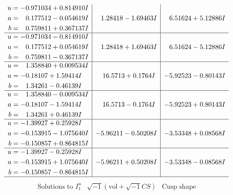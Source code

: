 \documentclass[1p]{elsarticle_modified}
\theoremstyle{definition}
\newcommand{\I}{\sqrt{-1}}
\begin{document}
$$\begin{array}{c|c|c}
\begin{aligned}
u &= -0.971034 + 0.814910 I \\
a &= \phantom{-}0.177512 - 0.054619 I \\
b &= \phantom{-}0.759811 + 0.367137 I\end{aligned}
 & \phantom{-}1.28418 - 1.69463 I & \phantom{-}6.51624 + 5.12886 I \\ \hline\begin{aligned}
u &= -0.971034 - 0.814910 I \\
a &= \phantom{-}0.177512 + 0.054619 I \\
b &= \phantom{-}0.759811 - 0.367137 I\end{aligned}
 & \phantom{-}1.28418 + 1.69463 I & \phantom{-}6.51624 - 5.12886 I \\ \hline\begin{aligned}
u &= \phantom{-}1.358840 + 0.009534 I \\
a &= -0.18107 + 1.59414 I \\
b &= \phantom{-}1.34261 - 0.46139 I\end{aligned}
 & \phantom{-}16.5713 + 0.1764 I & -5.92523 - 0.80143 I \\ \hline\begin{aligned}
u &= \phantom{-}1.358840 - 0.009534 I \\
a &= -0.18107 - 1.59414 I \\
b &= \phantom{-}1.34261 + 0.46139 I\end{aligned}
 & \phantom{-}16.5713 - 0.1764 I & -5.92523 + 0.80143 I \\ \hline\begin{aligned}
u &= -1.39927 + 0.25928 I \\
a &= -0.153915 - 1.075640 I \\
b &= -0.150857 + 0.864815 I\end{aligned}
 & -5.96211 - 0.50208 I & -3.53348 + 0.08568 I \\ \hline\begin{aligned}
u &= -1.39927 - 0.25928 I \\
a &= -0.153915 + 1.075640 I \\
b &= -0.150857 - 0.864815 I\end{aligned}
 & -5.96211 + 0.50208 I & -3.53348 - 0.08568 I\\
 \hline 
 \end{array}$$\newpage$$\begin{array}{c|c|c}  
\text{Solutions to }I^u_{1}& \I (\text{vol} + \sqrt{-1}CS) & \text{Cusp shape}\\
 \hline 
\begin{aligned}

\end{aligned}
\end{array}$$
\end{document}
